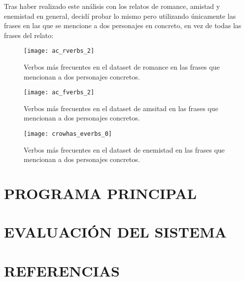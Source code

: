 \documentclass{pre-tfg}
\begin{document}

Tras haber realizado este análisis con los relatos de romance, amistad y enemistad en general, decidí probar lo mismo pero utilizando únicamente las frases en las que se mencione a dos personajes en concreto, en vez de todas las frases del relato:

\begin{figure}
	\centering
	\texttt{[image: ac\_rverbs\_2]}
	\caption{Verbos más frecuentes en el dataset de romance en las frases que mencionan a dos personajes concretos.}
	\label{fig:r_verb_freq_in_character_mentions}
\end{figure}


\begin{figure}
	\centering
	\texttt{[image: ac\_fverbs\_2]}
	\caption{Verbos más frecuentes en el dataset de amsitad en las frases que mencionan a dos personajes concretos.}
	\label{fig:f_verb_freq_in_character_mentions}
\end{figure}


\begin{figure}
	\centering
	\texttt{[image: crowhas\_everbs\_0]}
	\caption{Verbos más frecuentes en el dataset de enemistad en las frases que mencionan a dos personajes concretos.}
	\label{fig:e_verb_freq_in_character_mentions}
\end{figure}


\section{PROGRAMA PRINCIPAL}


\section{EVALUACIÓN DEL SISTEMA}


\section{REFERENCIAS}





\singlespacing
%

\end{document}
